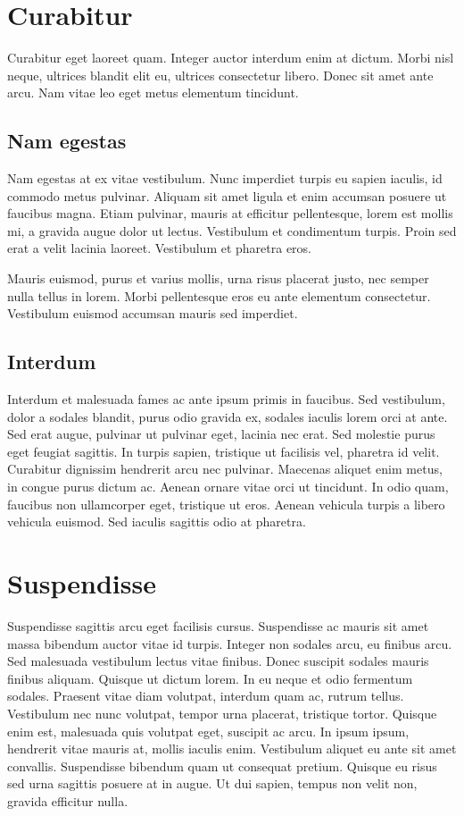 \documentclass{ClassTeX}
\begin{document}
	 \section{Curabitur}
	 Curabitur eget laoreet quam. Integer auctor interdum enim at dictum. Morbi nisl neque, ultrices blandit elit eu, ultrices consectetur libero. Donec sit amet ante arcu. Nam vitae leo eget metus elementum tincidunt. 
	 \subsection{Nam egestas}
	 Nam egestas at ex vitae vestibulum. Nunc imperdiet turpis eu sapien iaculis, id commodo metus pulvinar. Aliquam sit amet ligula et enim accumsan posuere ut faucibus magna. Etiam pulvinar, mauris at efficitur pellentesque, lorem est mollis mi, a gravida augue dolor ut lectus. Vestibulum et condimentum turpis. Proin sed erat a velit lacinia laoreet. Vestibulum et pharetra eros. 
	 
	 Mauris euismod, purus et varius mollis, urna risus placerat justo, nec semper nulla tellus in lorem. Morbi pellentesque eros eu ante elementum consectetur. Vestibulum euismod accumsan mauris sed imperdiet.
	 
	 \subsection{Interdum}
	 Interdum et malesuada fames ac ante ipsum primis in faucibus. Sed vestibulum, dolor a sodales blandit, purus odio gravida ex, sodales iaculis lorem orci at ante. Sed erat augue, pulvinar ut pulvinar eget, lacinia nec erat. Sed molestie purus eget feugiat sagittis. In turpis sapien, tristique ut facilisis vel, pharetra id velit. Curabitur dignissim hendrerit arcu nec pulvinar. Maecenas aliquet enim metus, in congue purus dictum ac. Aenean ornare vitae orci ut tincidunt. In odio quam, faucibus non ullamcorper eget, tristique ut eros. Aenean vehicula turpis a libero vehicula euismod. Sed iaculis sagittis odio at pharetra.
	 
	 \section{Suspendisse}
	 Suspendisse sagittis arcu eget facilisis cursus. Suspendisse ac mauris sit amet massa bibendum auctor vitae id turpis. Integer non sodales arcu, eu finibus arcu. Sed malesuada vestibulum lectus vitae finibus. Donec suscipit sodales mauris finibus aliquam. Quisque ut dictum lorem. In eu neque et odio fermentum sodales. Praesent vitae diam volutpat, interdum quam ac, rutrum tellus. Vestibulum nec nunc volutpat, tempor urna placerat, tristique tortor. Quisque enim est, malesuada quis volutpat eget, suscipit ac arcu. In ipsum ipsum, hendrerit vitae mauris at, mollis iaculis enim. Vestibulum aliquet eu ante sit amet convallis. Suspendisse bibendum quam ut consequat pretium. Quisque eu risus sed urna sagittis posuere at in augue. Ut dui sapien, tempus non velit non, gravida efficitur nulla.
	
\end{document}
